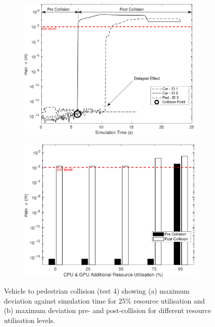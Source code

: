 \documentclass[letterpaper, 10 pt, journal, twoside]{IEEEtran}
\begin{document}
\begin{figure}[h]
    \centering
    \begin{subfigure}{.49\textwidth}
        \includegraphics[width=1\textwidth]{Other/Figures/CarsPeopleCollsionsCG25_V3.pdf}
        \caption{}
        \label{CarsPeopleCollsionsCG25}
    \end{subfigure}
    \begin{subfigure}{.49\textwidth}
        \includegraphics[width=1\textwidth]{Other/Figures/CarsPeopleCollisionPrePostV5.pdf}
        \caption{}
        \label{CarsPeopleCollisionPrePost}
    \end{subfigure}
    \caption{Vehicle to pedestrian collision (test 4) showing (a) maximum deviation against simulation time for 25\% resource utilisation and (b) maximum deviation pre- and post-collision for different resource utilisation levels.}
\end{figure}
\end{document}

